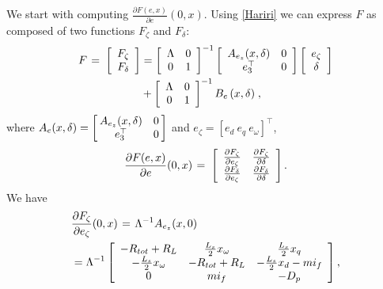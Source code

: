 \documentclass[letterpaper,10pt,conference]{ieeeconf}
\renewcommand{\L}    {{\Lambda}}
\renewcommand{\o}    {{\omega}}
\newcommand{\m}      {{\hbox{\hskip 1pt}}}
\newcommand{\nm}     {{\hbox{\hskip -3pt}}}
\begin{document}
We start with computing $\frac{\partial F(e,x)}{\partial e}(0,
x)$. Using \eqref{Hariri} we can express $F$ as composed of two 
functions $F_\zeta$ and $F_\delta$:
$$ \begin{aligned} F \m=\m \left[\begin{array}{cc} F_\zeta \\ 
   F_\delta \end{array}\right] &= \left[\begin{array}{cc}
   \L & 0\\ 0 & 1 \end{array}\right]^{-1} \left[\begin{array}{cc}
   A_{e_z}(x,\delta) & 0\\ e_3^\top & 0 \end{array}\right] \left[
   \begin{array}{cc} e_\zeta \\ \delta \end{array}\right]\\ &+ 
   \left[\begin{array}{cc} \L & 0\\ 0 & 1 \end{array}\right]^{-1}
   B_e\left(x,\delta\right) \m,\end{aligned}$$
where $A_e(x,\delta)=\left[\nm\begin{array}{cc} A_{e_z}(x,\delta) 
& 0\\ e_3^\top & 0\end{array}\nm\right]$ and $e_\zeta=\left[e_d \ 
e_q \ e_\o \right]^\top$,
$$ \frac{\partial F(e,x)}{\partial e}(0,x) \m=\m \left[
   \begin{array}{cccc} \frac{\partial F_\zeta}{\partial e_\zeta} 
   & \frac{\partial F_\zeta}{\partial \delta} \\ \frac{\partial
   F_\delta}{\partial e_\zeta}  & \frac{\partial F_\delta}
   {\partial \delta} \end{array}\right].$$
We have 
$$ \begin{aligned} &\frac{\partial F_\zeta}{\partial e_\zeta}(0,x)
   \m=\m \L^{-1}A_{e_z}(x,0)\\ &=\L^{-1}\left[\begin{array}{ccc} 
   -R_{tot}+R_L & \frac{L_s}{2}x_{\o} & \frac{L_s}{2} x_q \\ 
   -\frac{L_s}{2}x_{\o} & -R_{tot} + R_L & -\frac{L_s}{2} x_d-mi_f
   \\ 0 & mi_f & -D_p \end{array}\right],\end{aligned}$$
\end{document}
